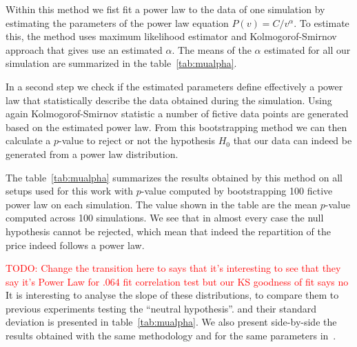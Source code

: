 \documentclass{wscpaperproc}
\newcommand{\memo}[2]{\textcolor{#1}{#2}}
\newcommand{\todo}[1]{\memo{red}{TODO: #1\\}}
\begin{document}
Within this method we fist fit a power law to the data of one simulation by estimating the parameters of the power law equation $P(v)=C/v^\alpha $.
To estimate this, the method uses maximum likelihood estimator and Kolmogorof-Smirnov approach that gives use an estimated $\alpha$. The means of the $\alpha$ estimated for all our simulation are summarized in the table~\ref{tab:mualpha}.

In a second step we check if the estimated parameters define effectively a power law that statistically describe the data obtained during the simulation. Using again Kolmogorof-Smirnov statistic a number of fictive data points are generated based on the estimated power law. From this bootstrapping method we can then calculate a $p$-value to reject or not the hypothesis $H_0$ that our data can indeed be generated from a power law distribution. 

The table~\ref{tab:mualpha} summarizes the results obtained by this method on all setups used for this work with $p$-value computed by bootstrapping 100 fictive power law on each simulation. The value shown in the table are the mean $p$-value computed across 100 simulations. We see that in almost every case the null hypothesis cannot be rejected, which mean that indeed the repartition of the price indeed follows a power law.



\todo{Change the transition here to says that it's interesting to see that they say it's Power Law for .064 fit correlation test but our KS goodness of fit says no}
It is interesting to analyse the slope of these distributions, to compare them to previous experiments testing the ``neutral hypothesis''.  and their standard deviation is presented in table~\ref{tab:mualpha}. We also present side-by-side the results obtained with the same methodology and for the same parameters in~\cite{bentley_random_2004}.
\end{document}
